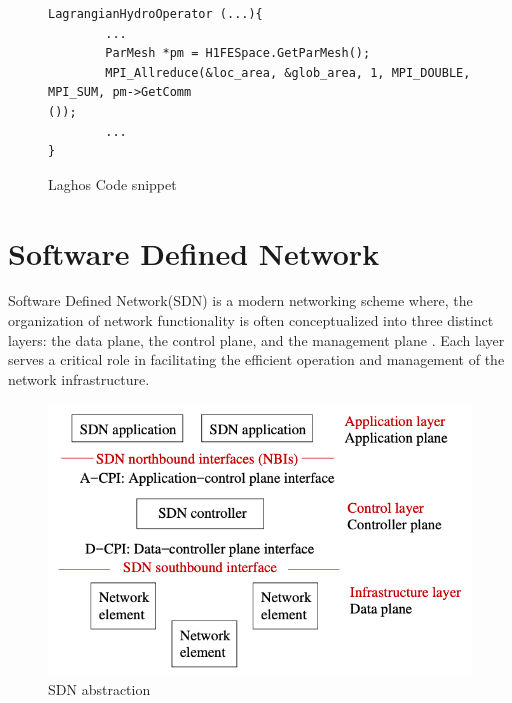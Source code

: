 \begin{figure}[hbtp]
\caption{Laghos Code snippet}
\label{code.laghos}
\begin{lstlisting}[breaklines]
LagrangianHydroOperator (...){
        ...
        ParMesh *pm = H1FESpace.GetParMesh();
        MPI_Allreduce(&loc_area, &glob_area, 1, MPI_DOUBLE, MPI_SUM, pm->GetComm
());
        ...
}
\end{lstlisting}
\end{figure}

\section{Software Defined Network}
Software Defined Network(SDN) is a modern networking scheme where, the organization of network functionality is often conceptualized into three distinct layers: the data plane, the control plane, and the management plane \cite{kreutz2014software}. Each layer serves a critical role in facilitating the efficient operation and management of the network infrastructure.

\begin{figure}[h]
  \centering
  \includegraphics[width=0.8\columnwidth]{figs/sdn.png}
  \caption{SDN abstraction }
  \label{fig:sdn_abs}
\end{figure}



